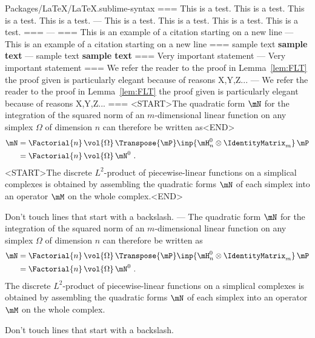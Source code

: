 Packages/LaTeX/LaTeX.sublime-syntax
===
This is a test. This is a test. This is a test. This is a test. %
---
This is a test. This is a test. This is a test. This is a test. %
===
---
===
This is an example of a citation starting on a new line
\cite{Newton1687}
---
This is an example of a citation starting on a new line \cite{Newton1687}
===
sample text
\textbf{sample text}
---
sample text \textbf{sample text}
===
Very important statement
---
Very important statement
===
We refer the reader to the proof in Lemma~\ref{lem:FLT}
the proof given is particularly elegant because of reasons X,Y,Z...
---
We refer the reader to the proof in Lemma~\ref{lem:FLT}
the proof given is particularly elegant because of reasons X,Y,Z...
===
<START>The quadratic form $\mN$ for the integration of the squared norm of an $m$-dimensional linear function on any simplex $\Omega$ of dimension $n$ can therefore be written as<END>
\begin{align}
\label{eq:integration_matrix}
\mN &= \Factorial{n} \, \vol{\Omega} \, \Transpose{\mP} \inp{\mH^0_n \otimes \IdentityMatrix_m} \, \mP \nonumber\\%
    &= \Factorial{n} \, \vol{\Omega} \, \mN^0~.
\end{align}
<START>The discrete $L^2$-product of piecewise-linear functions on a simplical complexes is obtained by assembling the quadratic forms $\mN$ of each simplex into an operator $\mM$ on the whole complex.<END>

Don't touch lines that start with a backslash.
---
The quadratic form $\mN$ for the integration of the squared norm of an
$m$-dimensional linear function on any simplex $\Omega$ of dimension $n$ can
therefore be written as
\begin{align}
\label{eq:integration_matrix}
\mN &= \Factorial{n} \, \vol{\Omega} \, \Transpose{\mP} \inp{\mH^0_n \otimes \IdentityMatrix_m} \, \mP \nonumber\\%
    &= \Factorial{n} \, \vol{\Omega} \, \mN^0~.
\end{align}
The discrete $L^2$-product of piecewise-linear functions on a simplical
complexes is obtained by assembling the quadratic forms $\mN$ of each simplex
into an operator $\mM$ on the whole complex.

Don't touch lines that start with a backslash.

